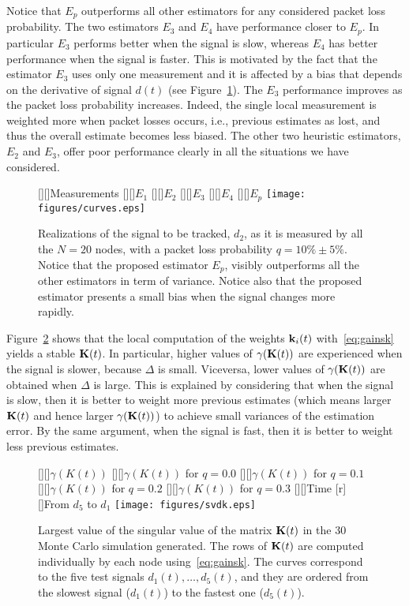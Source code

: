 \documentclass[a4paper,notitlepage,onecolumn]{article}
\def\K{{\cal K}}
\def\k{{\bf k}}
\def\K{{\bf K}}
\numberwithin{equation}{section}
\begin{document}
Notice that $E_p$ outperforms all other estimators for any
considered packet loss probability. The two estimators $E_3$ and
$E_4$ have performance closer to $E_p$. In particular $E_3$
performs better when the signal is slow, whereas $E_4$ has better
performance when the signal is faster. This is motivated by the
fact that the estimator $E_3$ uses only one measurement and it is
affected by a bias that depends on the derivative of signal $d(t)$
(see Figure~\ref{fig:curves}). The $E_3$ performance improves as
the packet loss probability increases. Indeed, the single local
measurement is weighted more when packet losses occurs, i.e.,
previous estimates as lost, and thus the overall estimate becomes
less biased. The other two heuristic estimators, $E_2$ and $E_3$,
offer poor performance clearly in all the situations we have
considered.
\begin{figure}
    \centering
    [][]{Measurements}
    [][]{$E_1$}
    [][]{$E_2$}
    [][]{$E_3$}
    [][]{$E_4$}
    [][]{$E_p$}
    \texttt{[image: figures/curves.eps]}
    \caption{Realizations of the signal to be tracked, $d_2$, as it is measured by all the $N=20$ nodes, with a packet loss probability $q=10\%\pm5\%$. Notice that the proposed estimator $E_p$, visibly outperforms all the other estimators in term of variance. Notice also that the proposed estimator presents a small bias when the signal changes more rapidly.}
    \label{fig:curves}
\end{figure}
Figure~\ref{fig:svdk} shows that the local computation of the weights $\k_i(t)$ with~\eqref{eq:gainsk} yields a stable $\K(t)$. In particular, higher values of $\gamma(\K(t))$ are experienced when the signal is slower, because $\Delta$ is small. Viceversa, lower values of $\gamma(\K(t))$ are obtained when $\Delta$ is large. This is explained by considering that when the signal is slow, then it is better to weight more previous estimates (which means larger $\K(t)$ and hence larger $\gamma(\K(t))$) to achieve small variances of the estimation error. By the same argument, when the signal is fast, then it is better to weight less previous estimates.
\begin{figure}
    \centering
    [][]{$\gamma(K(t))$}
    [][]{$\gamma(K(t))$ for $q=0.0$}
    [][]{$\gamma(K(t))$ for $q=0.1$}
    [][]{$\gamma(K(t))$ for $q=0.2$}
    [][]{$\gamma(K(t))$ for $q=0.3$}
    [][]{Time}
    [r][]{\small{From $d_5$ to $d_1$}}
    \texttt{[image: figures/svdk.eps]}
    \caption{Largest value of the singular value of the matrix $\K(t)$ in the 30 Monte Carlo simulation generated. The rows of $\K(t)$ are computed individually by each node using~\eqref{eq:gainsk}. The curves correspond to the five test signals $d_1(t),\dots,d_5(t)$, and they are ordered from the slowest signal ($d_1(t)$) to the fastest one ($d_5(t)$).}
    \label{fig:svdk}
\end{figure}
\end{document}
